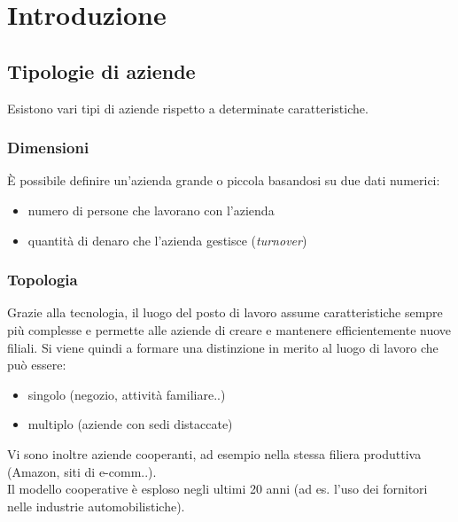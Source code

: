 \chapter{Introduzione}
\section{Tipologie di aziende}
Esistono vari tipi di aziende rispetto a determinate caratteristiche.
\subsection{Dimensioni}
\`E possibile definire un'azienda grande o piccola basandosi su due dati numerici:
\begin{itemize}
\item numero di persone che lavorano con l'azienda
\item quantit\`a di denaro che l'azienda gestisce (\textit{turnover})
\end{itemize}
\subsection{Topologia}
Grazie alla tecnologia, il luogo del posto di lavoro assume caratteristiche sempre pi\`u complesse
e permette alle aziende di creare e mantenere efficientemente nuove filiali.
Si viene quindi a formare una distinzione in merito al luogo di lavoro che pu\`o essere:
\begin{itemize}
\item singolo (negozio, attivit\`a familiare..)
\item multiplo (aziende con sedi distaccate)
\end{itemize}
Vi sono inoltre aziende cooperanti, ad esempio nella stessa filiera produttiva (Amazon, siti di e-comm..). \\
Il modello cooperative \`e esploso negli ultimi 20 anni (ad es. l'uso dei fornitori nelle industrie automobilistiche).

